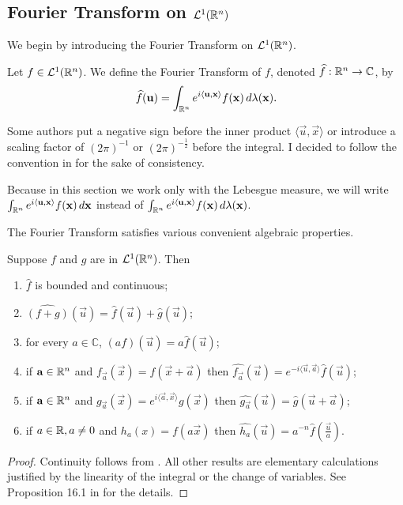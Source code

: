 \subsection{Fourier Transform on ${\mathcal {L}^1}({\mathbb R}^n)$}
We begin by introducing the Fourier Transform on ${\mathcal {L}^1}({\mathbb R}^n)$.
\begin{definition}
Let $f \in {\mathcal {L}^1}({\mathbb R}^n)$. We define the Fourier Transform of $f$, denoted $\widehat{f} : {\mathbb R}^n \to \mathbb{C}$, by 
\begin{align*}
    \widehat{f} (\mathbf{u}) = \int_{{\mathbb R}^n} e^{i \langle \mathbf{u}, \mathbf{x} \rangle } f(\mathbf{x}) \, d \lambda(\mathbf{x}).
\end{align*}
\begin{remark}
Some authors put a negative sign before the inner product $\langle \vec{u}, \vec{x} \rangle$ or introduce a scaling factor of $(2 \pi)^{-1}$ or $(2 \pi)^{-\frac{1}{2}}$ before the integral. I decided to follow the convention in \cite{bass2011real} for the sake of consistency.
\end{remark}
\begin{remark}
Because in this section we work only with the Lebesgue measure, we will write $\int_{{\mathbb R}^n} e^{i \langle \mathbf{u}, \mathbf{x} \rangle } f(\mathbf{x}) \, d \mathbf{x}$ instead of $ \int_{{\mathbb R}^n} e^{i \langle \mathbf{u}, \mathbf{x} \rangle } f(\mathbf{x}) \, d \lambda(\mathbf{x})$.
\end{remark}
The Fourier Transform satisfies various convenient algebraic properties.
\begin{proposition}
\label{prop:fourier:basics}
Suppose $f$ and $g$ are in ${\mathcal {L}^1}({\mathbb R}^n)$. Then 
\begin{enumerate}[noitemsep]
    \item $\widehat{f}$ is bounded and continuous;
    \item $\widehat{(f + g)}(\vec{u}) = \widehat{f}(\vec{u})+ \widehat{g}(\vec{u})$;
    \item for every $a \in \mathbb{C}$, $\widehat{(af)}(\vec{u}) = a\widehat{f}(\vec{u})$;
    \item if $\mathbf{a} \in {\mathbb R}^n$ and $f_\vec{a} (\vec{x}) = f (\vec{x} + \vec{a})$ then $\widehat{f_\vec{a}}(\vec{u}) = e^{-i \langle \vec{u}, \vec{a} \rangle} \widehat{f}(\vec{u})$;
    \item if $\mathbf{a} \in {\mathbb R}^n$ and $g_\vec{a} (\vec{x}) =  e^{i \langle \vec{a}, \vec{x}  \rangle} g(\vec{x})$ then $\widehat{g_\vec{a}}(\vec{u}) = \widehat{g} (\vec{u} + \vec{a})$;
    \item if $a \in {\mathbb R}, a \neq 0$ and $h_a (x) = f (a \vec{x})$ then $\widehat{h_{a}}(\vec{u}) = a^{-n} \widehat{f}(\frac{\vec{u}}{a})$.
\end{enumerate}
\end{proposition}
\begin{proof}
Continuity follows from . All other results are elementary calculations justified by the linearity of the integral or the change of variables. See Proposition 16.1 in \cite{bass2011real} for the details.
\end{proof}
\end{definition}